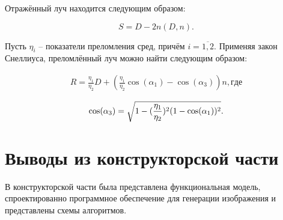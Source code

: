 Отражённый луч находится следующим образом:

\begin{equation}
S = D - 2n(D, n).
\end{equation}

Пусть $\eta_i$ -- показатели преломления сред, причём $i = \overline{1,2}$. 
Применяя закон Снеллиуса, преломлённый луч можно найти следующим образом:

\begin{equation}
\begin{aligned}
R = \frac{\eta_1}{\eta_2}D + ( \frac{\eta_1}{\eta_2}\cos(\alpha_1) - \cos(\alpha_3))n, где
\end{aligned}
\end{equation}

\begin{equation}
\cos(\alpha_3) = \sqrt{1 - ({\eta_1\over\eta_2})^2(1 - \cos(\alpha_1))^2}.
\end{equation}

\section{Выводы из конструкторской части}

В конструкторской части была представлена функциональная модель, спроектированно программное обеспечение для генерации изображения и представлены схемы алгоритмов.
